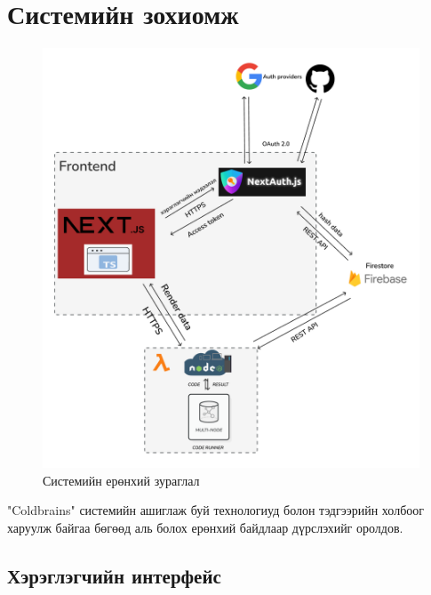 \chapter{Системийн зохиомж}

\begin{figure}[h]
  \centering
  \includegraphics{img/diagrams/architecture.PNG}
  \caption{Системийн ерөнхий зураглал}
\end{figure}

"Coldbrains" системийн ашиглаж буй технологиуд болон тэдгээрийн холбоог харуулж байгаа бөгөөд аль болох ерөнхий байдлаар дүрслэхийг оролдов.

\clearpage

\section{Хэрэглэгчийн интерфейс}
